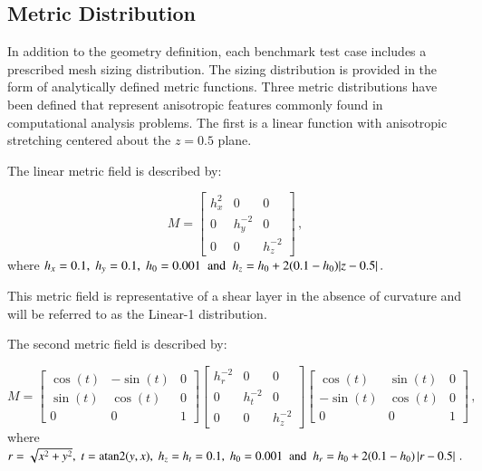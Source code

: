 \documentclass[3p,times,procedia,number]{elsarticle}
\begin{document}
\subsection{Metric Distribution}

In addition to the geometry definition, each benchmark test case includes a prescribed mesh sizing distribution.
The sizing distribution is provided in the form of analytically defined metric functions.
Three metric distributions have been defined that represent anisotropic features commonly found in computational analysis problems.
The first is a linear function with anisotropic stretching centered about the $z=0.5$ plane.

The linear metric field is described by:

\begin{equation}
\label{eq:Linear1}
M = \begin{bmatrix}
h_x^2 & 0 & 0 \\
0 & h_y^{-2} & 0 \\
0 & 0 & h_z^{-2} 
\end{bmatrix} \,,
\end{equation}
where
$h_x = 0.1,\; h_y = 0.1,\; h_0 = 0.001 \textrm{\; and\; } h_z = h_0 + 2 (0.1-h_0) |z-0.5|\,.$

This metric field is representative of a shear layer in the absence of curvature and will be referred to as the Linear-1 distribution.  

The second metric field is described by: 

\begin{equation}
\label{eq:Polar1}
M = 
\begin{bmatrix}
\cos(t) & -\sin(t) & 0 \\ 
\sin(t) & \cos(t) &  0 \\ 
0   &    0   &  1 
\end {bmatrix}
\begin{bmatrix}
h_r^{-2} &  0  &    0   \\ 
0 &   h_t^{-2} &  0  \\  
0 &   0  &  h_z^{-2} 
\end {bmatrix}
\begin{bmatrix}
\cos(t) & \sin(t) &  0  \\
-\sin(t) & \cos(t) &  0  \\
0  &     0  &    1
\end {bmatrix} \,,
\end{equation}
where
$r = \sqrt{x^2+y^2},\; t = \textrm{atan2}(y,x),\; h_z = h_t = 0.1,\; h_0 = 0.001\textrm{\; and\; } h_r = h_0 + 2 (0.1-h_0) \left|r-0.5\right| \,. $
\end{document}
